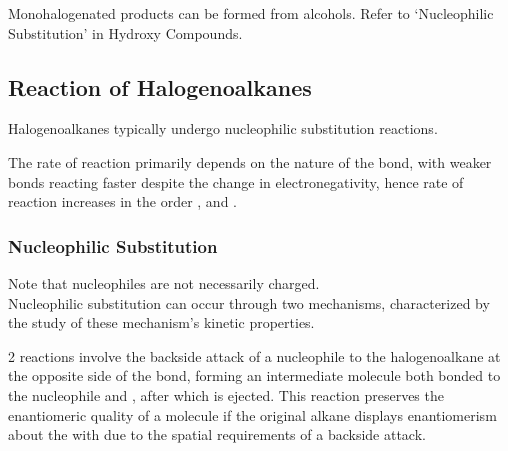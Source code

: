 \documentclass[../main]{subfiles}
\begin{document}
	Monohalogenated products can be formed from alcohols. Refer to `Nucleophilic Substitution' in Hydroxy Compounds. \\

	\subsection{Reaction of Halogenoalkanes}

	Halogenoalkanes typically undergo nucleophilic substitution reactions.

	The rate of reaction primarily depends on the nature of the  bond, with weaker bonds reacting faster despite the change in electronegativity, hence rate of reaction increases in the order , and . \\

	\subsubsection{Nucleophilic Substitution}


	Note that nucleophiles are not necessarily charged. \\

	Nucleophilic substitution can occur through two mechanisms, characterized by the study of these mechanism's kinetic properties.


	2 reactions involve the backside attack of a nucleophile to the halogenoalkane at the opposite side of the  bond, forming an intermediate molecule both bonded to the nucleophile and , after which  is ejected. This reaction preserves the enantiomeric quality of a molecule if the original alkane displays enantiomerism about the  with  due to the spatial requirements of a backside attack. 

	 \\
\end{document}
